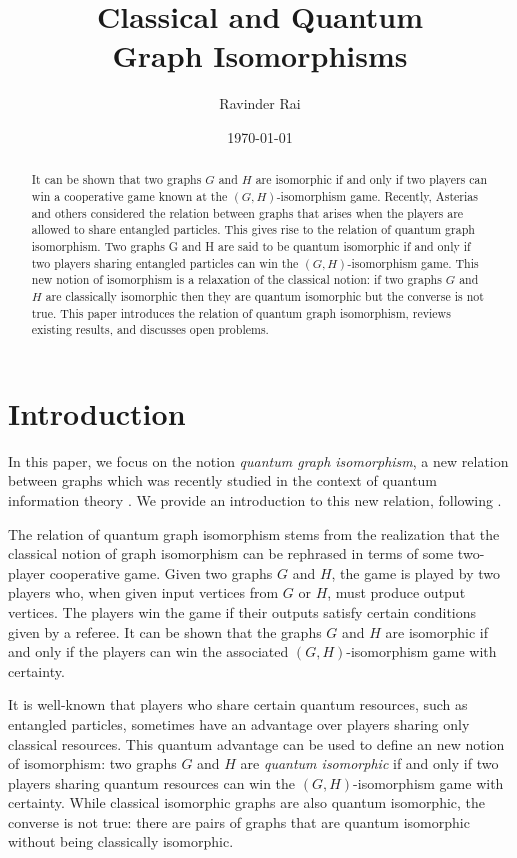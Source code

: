 \documentclass[12pt]{article}
\title{\textbf{Classical and Quantum \\ Graph Isomorphisms}}
\author{Ravinder Rai}
\date{\today}
\begin{document}
 

\maketitle

\begin{abstract}
  It can be shown that two graphs $G$ and $H$ are isomorphic if and
  only if two players can win a cooperative game known at the
  $(G,H)$-isomorphism game. Recently, Asterias and others considered
  the relation between graphs that arises when the players are allowed
  to share entangled particles. This gives rise to the relation of
  quantum graph isomorphism. Two graphs G and H are said to be quantum
  isomorphic if and only if two players sharing entangled particles
  can win the $(G,H)$-isomorphism game. This new notion of isomorphism
  is a relaxation of the classical notion: if two graphs $G$ and $H$
  are classically isomorphic then they are quantum isomorphic but the
  converse is not true. This paper introduces the relation of quantum
  graph isomorphism, reviews existing results, and discusses open
  problems.
\end{abstract}

\section{Introduction}
\label{sec:intro}

In this paper, we focus on the notion \emph{quantum graph
  isomorphism}, a new relation between graphs which was recently
studied in the context of quantum information theory \cite{amrssv2016,
  mrv2018, lmr2017, rm2012, assz2017}. We provide an introduction to
this new relation, following \cite{amrssv2016}.

The relation of quantum graph isomorphism stems from the realization
that the classical notion of graph isomorphism can be rephrased in
terms of some two-player cooperative game. Given two graphs $G$ and
$H$, the game is played by two players who, when given input vertices
from $G$ or $H$, must produce output vertices. The players win the
game if their outputs satisfy certain conditions given by a
referee. It can be shown that the graphs $G$ and $H$ are isomorphic if
and only if the players can win the associated $(G,H)$-isomorphism
game with certainty.

It is well-known that players who share certain quantum resources,
such as entangled particles, sometimes have an advantage over players
sharing only classical resources. This quantum advantage can be used
to define an new notion of isomorphism: two graphs $G$ and $H$ are
\emph{quantum isomorphic} if and only if two players sharing quantum
resources can win the $(G,H)$-isomorphism game with certainty. While
classical isomorphic graphs are also quantum isomorphic, the converse
is not true: there are pairs of graphs that are quantum isomorphic
without being classically isomorphic.
\end{document}
